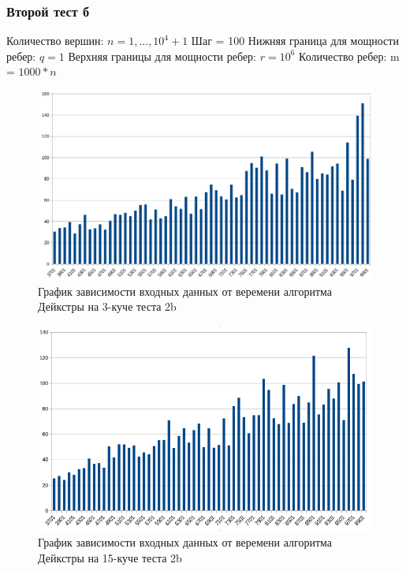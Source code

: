 \documentclass[a4paper, 12pt]{article}
\theoremstyle{definition}
\begin{document}
	\newpage
	
	\subsubsection{Второй тест б}
	
	Количество вершин: $n = 1, ... , 10^4+1$ \newline
	Шаг = 100 \newline
	Нижняя граница для мощности ребер: $q = 1$ \newline
	Верхняя границы для мощности ребер: $r = 10^6$ \newline
	Количество ребер: m = $1000*n$ \newline
	
	\begin{figure}[!ht]
		\centering
		\includegraphics[width=1\textwidth]{img/res2b_3.png}
		\caption{График зависимости входных данных от веремени алгоритма Дейкстры на 3-куче теста 2b}
		\label{fig:my_image}
	\end{figure}
	
	\begin{figure}[!ht]
		\centering
		\includegraphics[width=1\textwidth]{img/res2b_15.png}
		\caption{График зависимости входных данных от веремени алгоритма Дейкстры на 15-куче теста 2b}
		\label{fig:my_image}
	\end{figure}
	\newpage
	
\end{document}
